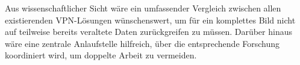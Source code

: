 \documentclass[12pt]{scrartcl}
\begin{document}
Aus wissenschaftlicher Sicht wäre ein umfassender Vergleich zwischen allen existierenden VPN-Lösungen wünschenswert, um für ein komplettes Bild nicht auf teilweise bereits veraltete Daten zurückgreifen zu müssen. Darüber hinaus wäre eine zentrale Anlaufstelle hilfreich, über die entsprechende Forschung koordiniert wird, um doppelte Arbeit zu vermeiden.

\newpage

\printbibliography
{}


\newpage
{}
\end{document}
